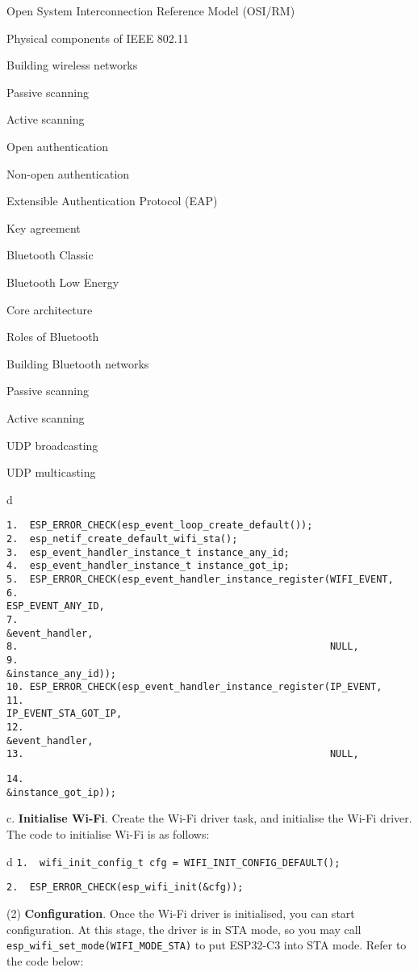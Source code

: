 \documentclass[a4paper,12pt]{book}
\begin{document}
\begin{term}{Open System Interconnection Reference Model (OSI/RM)}
\begin{term}{Physical components of IEEE 802.11}
\begin{term}{Building wireless networks}
\begin{term}{Passive scanning}
\begin{term}{Active scanning}
\begin{term}{Open authentication}
\begin{term}{Non-open authentication}
\begin{term}{Extensible Authentication Protocol (EAP)}
\begin{term}{Key agreement}
\begin{term}{Bluetooth Classic}
\begin{term}{Bluetooth Low Energy}
\begin{term}{Core architecture}
\begin{term}{Roles of Bluetooth}
\begin{term}{Building Bluetooth networks}
\begin{term}{Passive scanning}
\begin{term}{Active scanning}
\begin{term}{UDP broadcasting}
\begin{term}{UDP multicasting}
\begin{tabular}{d}
\vspace{2pt}
\begin{verbatim}
1.  ESP_ERROR_CHECK(esp_event_loop_create_default());
2.  esp_netif_create_default_wifi_sta();
3.  esp_event_handler_instance_t instance_any_id;
4.  esp_event_handler_instance_t instance_got_ip;
5.  ESP_ERROR_CHECK(esp_event_handler_instance_register(WIFI_EVENT,
6.                                                      ESP_EVENT_ANY_ID,
7.                                                      &event_handler,
8.                                                      NULL,
9.                                                      &instance_any_id));
10. ESP_ERROR_CHECK(esp_event_handler_instance_register(IP_EVENT,
11.                                                     IP_EVENT_STA_GOT_IP,
12.                                                     &event_handler,
13.                                                     NULL,
\end{verbatim}
\verb|14.                                                     &instance_got_ip));|
\end{tabular}


c. \textbf{Initialise Wi-Fi}. Create the Wi-Fi driver task, and initialise the Wi-Fi driver. The code to initialise Wi-Fi is as follows:


\begin{tabular}{d}
\verb|1.  wifi_init_config_t cfg = WIFI_INIT_CONFIG_DEFAULT();|

\verb|2.  ESP_ERROR_CHECK(esp_wifi_init(&cfg));|
\end{tabular}


(2) \textbf{Configuration}. Once the Wi-Fi driver is initialised, you can start configuration. At this stage, the driver is in STA mode, so you may call \verb|esp_wifi_set_mode(WIFI_MODE_STA)| to put ESP32-C3 into STA mode. Refer to the code below:



\end{term}
\end{term}
\end{term}
\end{term}
\end{term}
\end{term}
\end{term}
\end{term}
\end{term}
\end{term}
\end{term}
\end{term}
\end{term}
\end{term}
\end{term}
\end{term}
\end{term}
\end{term}
\end{document}
